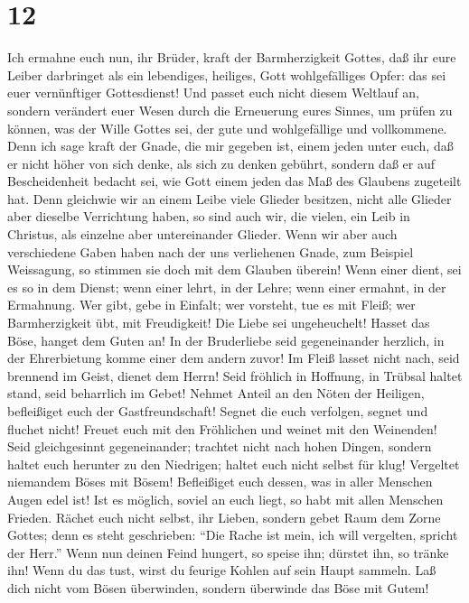 \hypertarget{section-11}{%
\section{12}\label{section-11}}

 Ich ermahne euch nun, ihr Brüder, kraft der
Barmherzigkeit Gottes, daß ihr eure Leiber darbringet als ein
lebendiges, heiliges, Gott wohlgefälliges Opfer: das sei euer
vernünftiger Gottesdienst!  Und passet euch nicht diesem
Weltlauf an, sondern verändert euer Wesen durch die Erneuerung eures
Sinnes, um prüfen zu können, was der Wille Gottes sei, der gute und
wohlgefällige und vollkommene.  Denn ich sage kraft der
Gnade, die mir gegeben ist, einem jeden unter euch, daß er nicht höher
von sich denke, als sich zu denken gebührt, sondern daß er auf
Bescheidenheit bedacht sei, wie Gott einem jeden das Maß des Glaubens
zugeteilt hat.  Denn gleichwie wir an einem Leibe viele
Glieder besitzen, nicht alle Glieder aber dieselbe Verrichtung haben,
 so sind auch wir, die vielen, ein Leib in Christus, als
einzelne aber untereinander Glieder.  Wenn wir aber auch
verschiedene Gaben haben nach der uns verliehenen Gnade, zum Beispiel
Weissagung, so stimmen sie doch mit dem Glauben überein! 
Wenn einer dient, sei es so in dem Dienst; wenn einer lehrt, in der
Lehre;  wenn einer ermahnt, in der Ermahnung. Wer gibt,
gebe in Einfalt; wer vorsteht, tue es mit Fleiß; wer Barmherzigkeit übt,
mit Freudigkeit!  Die Liebe sei ungeheuchelt! Hasset das
Böse, hanget dem Guten an!  In der Bruderliebe seid
gegeneinander herzlich, in der Ehrerbietung komme einer dem andern
zuvor!  Im Fleiß lasset nicht nach, seid brennend im
Geist, dienet dem Herrn!  Seid fröhlich in Hoffnung, in
Trübsal haltet stand, seid beharrlich im Gebet!  Nehmet
Anteil an den Nöten der Heiligen, befleißiget euch der Gastfreundschaft!
 Segnet die euch verfolgen, segnet und fluchet nicht!
 Freuet euch mit den Fröhlichen und weinet mit den
Weinenden!  Seid gleichgesinnt gegeneinander; trachtet
nicht nach hohen Dingen, sondern haltet euch herunter zu den Niedrigen;
haltet euch nicht selbst für klug!  Vergeltet niemandem
Böses mit Bösem! Befleißiget euch dessen, was in aller Menschen Augen
edel ist!  Ist es möglich, soviel an euch liegt, so habt
mit allen Menschen Frieden.  Rächet euch nicht selbst,
ihr Lieben, sondern gebet Raum dem Zorne Gottes; denn es steht
geschrieben: ``Die Rache ist mein, ich will vergelten, spricht der
Herr.''  Wenn nun deinen Feind hungert, so speise ihn;
dürstet ihn, so tränke ihn! Wenn du das tust, wirst du feurige Kohlen
auf sein Haupt sammeln.  Laß dich nicht vom Bösen
überwinden, sondern überwinde das Böse mit Gutem!

